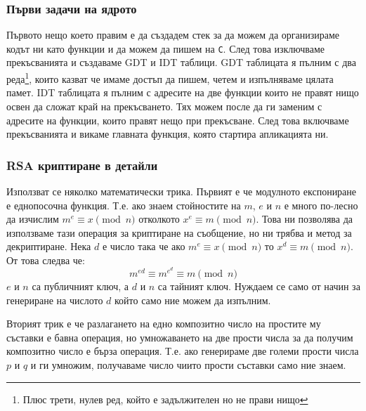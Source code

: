 \subsubsection{Първи задачи на ядрото}
Първото нещо което правим е да създадем стек за да можем да организираме кодът ни като функции и да можем да пишем на {\tt C}. След това изключваме прекъсванията и създаваме GDT и IDT таблици. GDT таблицата я пълним с два реда\footnote{Плюс трети, нулев ред, който е задължителен но не прави нищо}, които казват че имаме достъп да пишем, четем и изпълняваме цялата памет. IDT таблицата я пълним с адресите на две функции които не правят нищо освен да сложат край на прекъсването. Тях можем после да ги заменим с адресите на функции, които правят нещо при прекъсване. След това включваме прекъсванията и викаме главната функция, която стартира апликацията ни.

\subsubsection{RSA криптиране в детайли} \label{rsaalgo}
Използват се няколко математически трика. Първият е че модулното експониране е еднопосочна функция. Т.е. ако знаем стойностите на $m$, $e$ и $n$ е много по-лесно да изчислим $m^e \equiv x \pmod n$ отколкото $x^e \equiv m \pmod n$. Това ни позволява да използваме тази операция за криптиране на съобщение, но ни трябва и метод за декриптиране. Нека $d$ е число така че ако $m^e \equiv x \pmod n$ то $x^d \equiv m \pmod n$. От това следва че:
$$m^{ed} \equiv m^{e^d} \equiv m \pmod n$$
$e$ и $n$ са публичният ключ, а $d$ и $n$ са тайният ключ. Нуждаем се само от начин за генериране на числото $d$ който само ние можем да изпълним.

Вторият трик е че разлагането на едно композитно число на простите му съставки е бавна операция, но умножаването на две прости числа за да получим композитно число е бърза операция. Т.е. ако генерираме две големи прости числа $p$ и $q$ и ги умножим, получаваме число чиито прости съставки само ние знаем.


